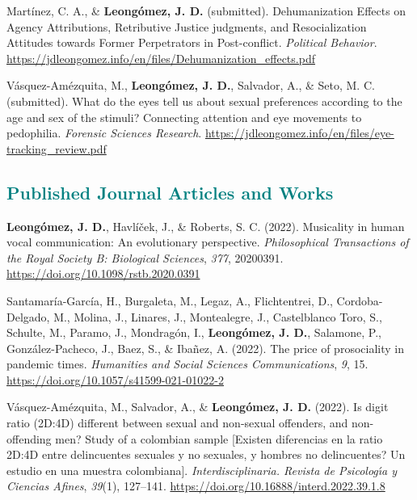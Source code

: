 \documentclass[11pt,a4paper,]{awesome-cv}
\begin{document}
\begingroup
\setlength{\parindent}{-0.5in}
\setlength{\leftskip}{0.5in}

\hypertarget{refs_working_paper}{}
\leavevmode{}%
Martínez, C. A., \& \textbf{Leongómez, J. D.} (submitted).
Dehumanization {Effects} on {Agency Attributions}, {Retributive Justice}
judgments, and {Resocialization Attitudes} towards {Former Perpetrators}
in {Post}-conflict. \emph{Political Behavior}.
\url{https://jdleongomez.info/en/files/Dehumanization_effects.pdf}

\leavevmode{}%
Vásquez-Amézquita, M., \textbf{Leongómez, J. D.}, Salvador, A., \& Seto,
M. C. (submitted). {What do the eyes tell us about sexual preferences
according to the age and sex of the stimuli? Connecting attention and
eye movements to pedophilia}. \emph{Forensic Sciences Research}.
\url{https://jdleongomez.info/en/files/eye-tracking_review.pdf}

\endgroup

\hypertarget{section-1}{%
\subsection{\texorpdfstring{\textcolor{teal}{Published Journal Articles and Works}}{}}\label{section-1}}

\begingroup
\setlength{\parindent}{-0.5in}
\setlength{\leftskip}{0.5in}

\hypertarget{refs_journals}{}
\leavevmode{}%
\textbf{Leongómez, J. D.}, Havlíček, J., \& Roberts, S. C. (2022).
Musicality in human vocal communication: {An} evolutionary perspective.
\emph{Philosophical Transactions of the Royal Society B: Biological
Sciences}, \emph{377}, 20200391.
\url{https://doi.org/10.1098/rstb.2020.0391}

\leavevmode{}%
Santamaría-García, H., Burgaleta, M., Legaz, A., Flichtentrei, D.,
Cordoba-Delgado, M., Molina, J., Linares, J., Montealegre, J.,
Castelblanco Toro, S., Schulte, M., Paramo, J., Mondragón, I.,
\textbf{Leongómez, J. D.}, Salamone, P., González-Pacheco, J., Baez, S.,
\& Ibañez, A. (2022). The price of prosociality in pandemic times.
\emph{Humanities and Social Sciences Communications}, \emph{9}, 15.
\url{https://doi.org/10.1057/s41599-021-01022-2}

\leavevmode{}%
Vásquez-Amézquita, M., Salvador, A., \& \textbf{Leongómez, J. D.}
(2022). Is digit ratio (2D:4D) different between sexual and non-sexual
offenders, and non-offending men? Study of a colombian sample
{{[}Existen diferencias en la ratio 2D:4D entre delincuentes sexuales y
no sexuales, y hombres no delincuentes? Un estudio en una muestra
colombiana{]}}. \emph{Interdisciplinaria. Revista de Psicolog{ı́}a y
Ciencias Afines}, \emph{39}(1), 127--141.
\url{https://doi.org/10.16888/interd.2022.39.1.8}
\end{document}
